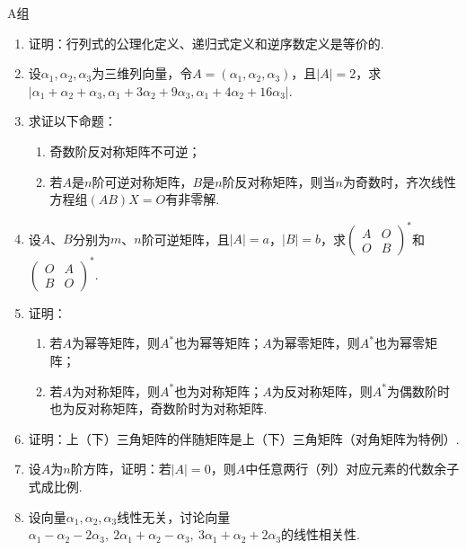 \centerline{\heiti A组}
\begin{enumerate}
    \item 证明：行列式的公理化定义、递归式定义和逆序数定义是等价的.

    \item 设$\alpha_1,\alpha_2,\alpha_3$为三维列向量，令$A=(\alpha_1,\alpha_2,\alpha_3)$，且$|A|=2$，求$|\alpha_1+\alpha_2+\alpha_3,\alpha_1+3\alpha_2+9\alpha_3,\alpha_1+4\alpha_2+16\alpha_3|$.

    \item 求证以下命题：
          \begin{enumerate}
              \item 奇数阶反对称矩阵不可逆；

              \item 若$A$是$n$阶可逆对称矩阵，$B$是$n$阶反对称矩阵，则当$n$为奇数时，齐次线性方程组$(AB)X=O$有非零解.
          \end{enumerate}

    \item 设$A$、$B$分别为$m$、$n$阶可逆矩阵，且$|A|=a$，$|B|=b$，求$\begin{pmatrix}
                  A & O \\ O & B
              \end{pmatrix}^*$和$\begin{pmatrix}
                  O & A \\ B & O
              \end{pmatrix}^*$.

    \item 证明：
          \begin{enumerate}
              \item 若$A$为幂等矩阵，则$A^*$也为幂等矩阵；$A$为幂零矩阵，则$A^*$也为幂零矩阵；

              \item 若$A$为对称矩阵，则$A^*$也为对称矩阵；$A$为反对称矩阵，则$A^*$为偶数阶时也为反对称矩阵，奇数阶时为对称矩阵.
          \end{enumerate}

    \item 证明：上（下）三角矩阵的伴随矩阵是上（下）三角矩阵（对角矩阵为特例）.

    \item 设$A$为$n$阶方阵，证明：若$|A|=0$，则$A$中任意两行（列）对应元素的代数余子式成比例.

    \item 设向量$\alpha_1,\alpha_2,\alpha_3$线性无关，讨论向量$\alpha_1-\alpha_2-2\alpha_3,\ 2\alpha_1+\alpha_2-\alpha_3,\ 3\alpha_1+\alpha_2+2\alpha_3$的线性相关性.


\end{enumerate}
